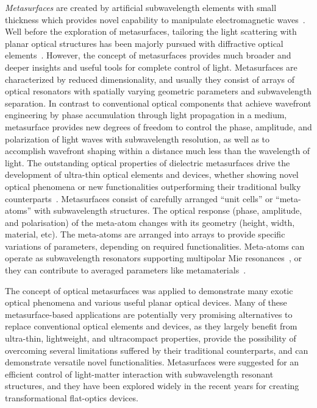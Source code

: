\documentclass[journal=chreay,manuscript=review]{achemso}
\begin{document}
{\it Metasurfaces} are created by artificial subwavelength elements with small thickness which provides novel capability to manipulate electromagnetic waves~\cite{kildishev_2013}. Well before the exploration of metasurfaces, tailoring the light scattering with planar optical structures has been majorly pursued with diffractive optical elements~\cite{lalanne_2017}. However, the concept of metasurfaces provides much broader and deeper insights and useful tools for complete control of light. Metasurfaces are characterized by reduced dimensionality, and usually they consist of arrays of optical resonators with spatially varying geometric parameters and subwavelength separation. In contrast to conventional optical components that achieve wavefront engineering by phase accumulation through light propagation in a medium, metasurface provides new degrees of freedom to control the phase, amplitude, and polarization of light waves with subwavelength resolution, as well as to accomplish wavefront shaping within a distance much less than the wavelength of light\cite{jung2021metasurface}. The outstanding optical properties of dielectric metasurfaces drive the development of ultra-thin optical elements and devices, whether showing novel optical phenomena or new functionalities outperforming their traditional bulky counterparts~\cite{levy_2020}. Metasurfaces consist of carefully arranged “unit cells” or “meta-atoms” with subwavelength structures. The optical response (phase, amplitude, and polarisation) of the meta-atom changes with its geometry (height, width, material, etc). The meta-atoms are arranged into arrays to provide specific variations of parameters, depending on required functionalities. Meta-atoms can operate as subwavelength resonators supporting multipolar Mie resonances~\cite{kruk2017functional}, or they can contribute to averaged parameters like metamaterials~\cite{tsai_2017}.

The concept of optical metasurfaces was applied to demonstrate many exotic optical phenomena and various useful planar optical devices. Many of these metasurface-based applications are potentially very promising alternatives to replace conventional optical elements and devices, as they largely benefit from ultra-thin, lightweight, and ultracompact properties, provide the possibility of overcoming several limitations suffered by their traditional counterparts, and can demonstrate versatile novel functionalities. Metasurfaces were suggested for an efficient control of light-matter interaction with subwavelength resonant structures, and they have been explored widely in the recent years for creating transformational flat-optics devices.
\end{document}
